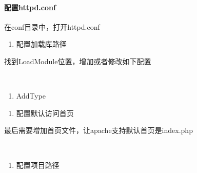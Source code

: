 \documentclass[letterpaper,10pt,english]{sphinxmanual}
\begin{document}
\paragraph{配置httpd.conf}
\label{\detokenize{interface/thinkPHP:httpd-conf}}
在conf目录中，打开httpd.conf
\begin{enumerate}
%
\item {} 
配置加载库路径

\end{enumerate}

找到LoadModule位置，增加或者修改如下配置

\begin{sphinxVerbatim}[commandchars=\\\{\}]
         
 
\end{sphinxVerbatim}
\begin{enumerate}
%
\setcounter{enumi}{1}
\item {} 
AddType

\end{enumerate}

\begin{sphinxVerbatim}[commandchars=\\\{\}]
  
\end{sphinxVerbatim}
\begin{enumerate}
%
\setcounter{enumi}{2}
\item {} 
配置默认访问首页

\end{enumerate}

最后需要增加首页文件，让apache支持默认首页是index.php

\begin{sphinxVerbatim}[commandchars=\\\{\}]
 
      
\end{sphinxVerbatim}
\begin{enumerate}
%
\setcounter{enumi}{3}
\item {} 
配置项目路径

\end{enumerate}
\end{document}
